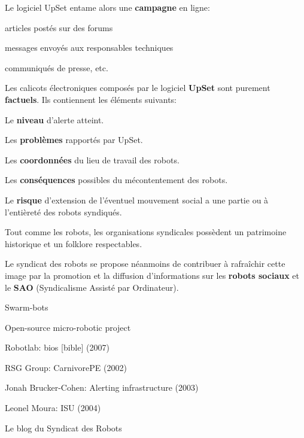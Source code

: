 {

Le logiciel UpSet{\trademark} entame alors une {\bf campagne} en ligne: 

\startitemize
\item articles post\'es sur des forums
\item messages envoy\'es aux responsables techniques
\item communiqu\'es de presse, etc.
\stopitemize
\par
Les calicots \'electroniques compos\'es par le logiciel
{\bf UpSet{\trademark}} sont purement {\bf factuels}. Ils contiennent les \'el\'ements suivants:

\startitemize
\item Le {\bf niveau} d'alerte atteint.
\item Les {\bf probl\`emes} rapport\'es par UpSet{\trademark}.
\item Les {\bf coordonn\'ees} du lieu de travail des robots.
\item Les {\bf cons\'equences} possibles du m\'econtentement des
robots.
\item Le {\bf risque} d'extension de l'\'eventuel mouvement social a une partie ou \`a l'enti\`eret\'e des robots syndiqu\'es.
\stopitemize
\par
{}

Tout comme les robots, les organisations syndicales poss\`edent un
patrimoine historique et un folklore respectables.


Le syndicat des robots se propose n\'eanmoins de contribuer \`a
rafra\^ichir cette image par la promotion et la diffusion
d'informations sur les {\bf robots sociaux} et le {\bf SAO} (Syndicalisme Assist\'e
par Ordinateur).

\page



\startitemize
\item Swarm{}-bots 
\item Open{}-source micro{}-robotic project 
\item Robotlab: bios [bible] (2007) 
\item RSG Group: CarnivorePE (2002) 
\item Jonah Brucker{}-Cohen: Alerting infrastructure (2003) 
\item Leonel Moura: ISU (2004) 
\stopitemize
\par
Le blog du Syndicat des Robots\crlf
{}}
